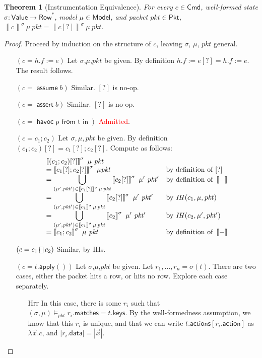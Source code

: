 \documentclass{article}
\newcommand{\pkt}{\mathit{pkt}}
\newcommand{\denote}[1]{\left\llbracket#1\right\rrbracket}
\newcommand{\Value}{\mathsf{Value}}
\newcommand{\Cmd}{\mathsf{Cmd}}
\newcommand{\Pkt}{\mathsf{Pkt}}
\newcommand{\Model}{\mathsf{Model}}
\newcommand{\Row}{\mathsf{Row}}
\newcommand{\matches}{\mathsf{matches}}
\newcommand{\action}{\mathsf{action}}
\newcommand{\actions}{\mathsf{actions}}
\newcommand{\keys}{\mathsf{keys}}
\newcommand{\data}{\mathsf{data}}
\newcommand{\assert}{\mathop{\mathsf{assert}}}
\newcommand{\assume}{\mathop{\mathsf{assume}}}
\newcommand{\apply}{\mathsf{apply}}
\newcommand{\choiceop}{\rotatebox[origin=c]{90}{$\sqsubset\!\!\!\sqsupset$}}
\newcommand{\choice}{\mathbin{\choiceop}}
\renewcommand{\choose}[2]{\mathop{\mathsf{havoc}~#1~\mathsf{from}~#2~\mathsf{in}}}
\newcommand{\satisfy}[3]{({#1,#3}) \models_{#2}}
\newtheorem{theorem}{Theorem}
\begin{document}
\begin{theorem}[Instrumentation Equivalence]
  \label{thm:instr-equiv}
  For every $c \in \Cmd$, well-formed state $\sigma : \Value \to \Row^*$, model
  $\mu \in \Model$, and packet $\pkt \in \Pkt$, $\denote{c}^\sigma~\mu~\pkt =
  \denote{c[?]}^\sigma~\mu~\pkt$.
\end{theorem}

\begin{proof}
  Proceed by induction on the structure of $c$, leaving $\sigma$, $\mu$, $\pkt$ general.
  \begin{enumerate}[align=left]
  \item[$(c = h.f := e)$]
    Let $\sigma$,$\mu$,$\pkt$ be given.
    By definition $h.f:=e[?] = h.f:=e$. The result follows.
  \item[$(c = \assume b)$] Similar. $[?]$ is no-op.
  \item[$(c = \assert b)$] Similar. $[?]$ is no-op.
  \item[$(c = \choose \rho t)$] \textcolor{red}{Admitted}.
  \item[$(c = c_1;c_2)$]
    Let $\sigma,\mu,\pkt$ be given.
    By definition $(c_1;c_2)[?] = c_1[?]; c_2[?]$.
    Compute as follows:
    \[\begin{array}{>{\displaystyle}ll}
    \denote{(c_1;c_2)[?]}^\sigma~\mu~\pkt \\
    = \denote{c_1[?];c_2[?]}^\sigma~\mu\pkt
    & \text{by definition of } [?]  \\
    = \bigcup_{(\mu',\pkt') \in \denote{c_1[?]}^\sigma\,\mu\,\pkt}\denote{c_2[?]}^\sigma~\mu'~\pkt'
    & \text{by definition of }\denote{-} \\
    = \bigcup_{(\mu',\pkt') \in \denote{c_1}^\sigma\,\mu\,\pkt}\denote{c_2[?]}^\sigma~\mu'~\pkt'
    & \text{by } \mathit{IH}(c_1, \mu, \pkt) \\
    = \bigcup_{(\mu',\pkt') \in \denote{c_1}^\sigma\,\mu\,\pkt}\denote{c_2}^\sigma~\mu'~\pkt'
    & \text{by } \mathit{IH}(c_2, \mu', \pkt') \\
    = \denote{c_1;c_2}^\sigma~\mu~\pkt
    & \text{by definition of } \denote{-}
    \end{array}
    \]
  \item[$(c = c_1 \choice c_2)$] Similar, by IHs.

  \item[$(c = t.\apply())$]
    Let $\sigma$,$\mu$,$\pkt$ be given.
    Let $r_1,\ldots,r_n = \sigma(t)$.
    There are two cases, either the packet hits a row, or hits no row. Explore each case separately.
    \begin{enumerate}
    \item[\textsc{Hit}] In this case, there is some $r_i$ such that $\satisfy \sigma \pkt \mu r_i.\matches = t.\keys$. By the well-formedness assumption,
      we know that this $r_i$ is unique, and that we can write
      $t.\actions[r_i.\action]$ as $\lambda \vec x. c$, and $|r_i.\data| = |\vec x|$.


\end{enumerate}
\end{enumerate}
\end{proof}
\end{document}
